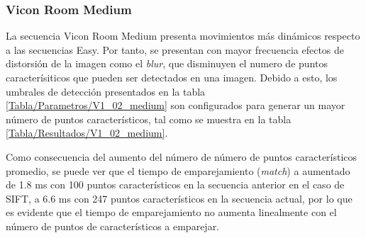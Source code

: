 %
%
%
%
%
%
%
%



\subsubsection{Vicon Room Medium}

La secuencia Vicon Room Medium presenta movimientos más dinámicos respecto a las secuencias Easy. Por tanto, se presentan con mayor frecuencia efectos de distorsión de la imagen como el \textit{blur}, que disminuyen el numero de puntos caracterísiticos que pueden ser detectados en una imagen. Debido a esto, los umbrales de detección presentados en la tabla \ref{Tabla/Parametros/V1_02_medium} son configurados para generar un mayor número de puntos característicos, tal como se muestra en la tabla \ref{Tabla/Resultados/V1_02_medium}.

Como consecuencia del aumento del número de número de puntos característicos promedio, se puede ver que el tiempo de emparejamiento (\textit{match}) a aumentado de 1.8 ms con 100 puntos característicos en la secuencia anterior en el caso de SIFT, a 6.6 ms con 247 puntos característicos en la secuencia actual, por lo que es evidente que el tiempo de emparejamiento no aumenta linealmente con el número de puntos de característicos a emparejar.


